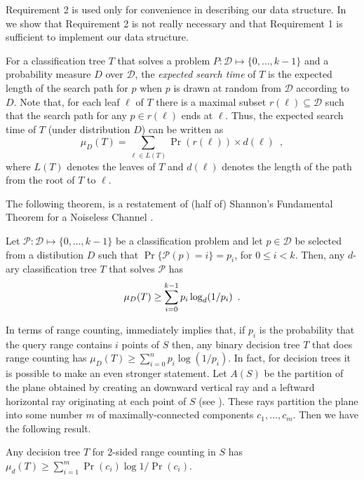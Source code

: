 \documentclass[lotsofwhite,charterfonts]{patmorin}
\newcommand{\depth}{d}
\begin{document}
Requirement 2 is used only for convenience in describing our data
structure.  In  we show that Requirement 2 is not
really necessary and that Requirement 1 is sufficient to implement our
data structure.

For a classification tree $T$ that solves a problem
$P:\mathcal{D}\mapsto\{0,\ldots,k-1\}$ and a probability measure $D$
over $\mathcal{D}$, the \emph{expected search time} of $T$ is the
expected length of the search path for $p$ when $p$ is drawn at random
from $\mathcal{D}$ according to $D$.  Note that, for each leaf $\ell$
of $T$ there is a maximal subset $r(\ell)\subseteq \mathcal{D}$ such
that the search path for any $p\in r(\ell)$ ends at $\ell$.  Thus, the
expected search time of $T$ (under distribution $D$) can be written as
\[
     \mu_D(T) = \sum_{\ell\in L(T)} \Pr(r(\ell))\times \depth(\ell)
	\enspace ,
\]
where $L(T)$ denotes the leaves of $T$ and $\depth(\ell)$ denotes the
length of the path from the root of $T$ to $\ell$.

The following theorem, is a restatement of (half of) Shannon's
Fundamental Theorem for a Noiseless Channel \cite[Theorem 9]{s48}.

\begin{thm}
Let $\mathcal{P}:\mathcal{D}\mapsto \{0,\ldots,k-1\}$ be a classification
problem and let $p\in \mathcal{D}$ be selected from a distibution $D$ such
that $\Pr\{\mathcal{P}(p)= i\}=p_i$, for $0\le i< k$.  Then, any
$d$-ary classification tree $T$ that solves $\mathcal{P}$ has
\begin{equation}
     \mu_D(T) \ge \sum_{i=0}^{k-1} p_i\log_d(1/p_i) \enspace .
	\eqlabel{shannon}
\end{equation}
\end{thm}

In terms of range counting,  immediately implies that,
if $p_i$ is the probability that the query range contains $i$ points
of $S$ then, any binary decision tree $T$ that does range counting
has $\mu_D(T) \ge \sum_{i=0}^{n} p_i\log(1/p_i)$.  In fact, for decision
trees it is possible to make an even stronger statement.  Let $A(S)$
be the partition of the plane obtained by creating an downward
vertical ray and a leftward horizontal ray originating at each point
of $S$ (see ).  These rays partition the plane into
some number $m$ of maximally-connected components $c_1,\ldots,c_m$.
Then we have the following result.

\begin{lem}
Any decision tree $T$ for 2-sided range counting in $S$ has $\mu_d(T)\ge
\sum_{i=1}^m\Pr(c_i)\log 1/\Pr(c_i)$.
\end{lem}
\end{document}
